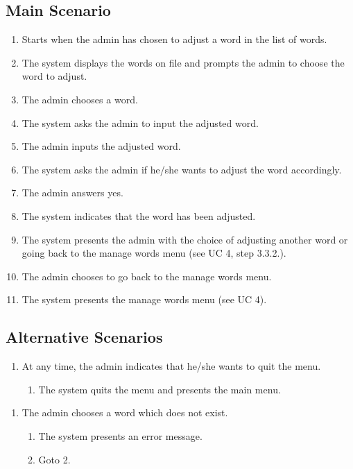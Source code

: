 \documentclass[12pt, letterpaper]{article}
\begin{document}
\subsection{Main Scenario}
\begin{enumerate}
	\item Starts when the admin has chosen to adjust a word in the list of words.
	\item The system displays the words on file and prompts the admin to choose the word to adjust.
	\item The admin chooses a word.
	\item The system asks the admin to input the adjusted word.
	\item The admin inputs the adjusted word.
	\item The system asks the admin if he/she wants to adjust the word accordingly.
	\item The admin answers yes.
	\item The system indicates that the word has been adjusted.
	\item The system presents the admin with the choice of adjusting another word or going back to the manage words menu (see UC 4, step 3.3.2.).
	\item The admin chooses to go back to the manage words menu.
	\item The system presents the manage words menu (see UC 4).
\end{enumerate}
\subsection{Alternative Scenarios}
\begin{enumerate}[label=a*.]
	\item At any time, the admin indicates that he/she wants to quit the menu.
	\begin{enumerate}[label=a*.1.]
		\item The system quits the menu and presents the main menu.
	\end{enumerate}
\end{enumerate}
\begin{enumerate}[label=3.1.]
	\item The admin chooses a word which does not exist. 
	\begin{enumerate}[label=3.1.\arabic*]
		\item The system presents an error message.
		\item Goto 2.
	\end{enumerate}
\end{enumerate}
\end{document}
